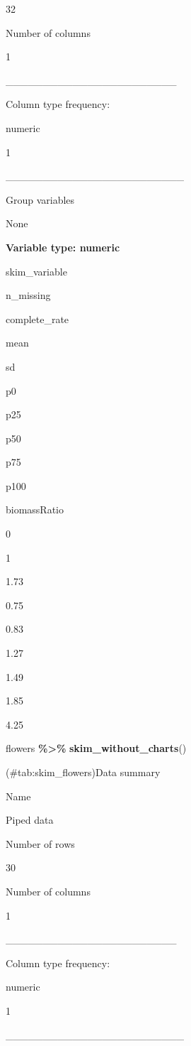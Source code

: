 \documentclass[
]{book}
\newenvironment{Shaded}{\begin{snugshade}}{\end{snugshade}}
\newcommand{\FunctionTok}[1]{\textcolor[rgb]{0.13,0.29,0.53}{\textbf{#1}}}
\newcommand{\NormalTok}[1]{#1}
\newcommand{\SpecialCharTok}[1]{\textcolor[rgb]{0.81,0.36,0.00}{\textbf{#1}}}
\begin{document}
32

Number of columns

1

\_\_\_\_\_\_\_\_\_\_\_\_\_\_\_\_\_\_\_\_\_\_\_

Column type frequency:

numeric

1

\_\_\_\_\_\_\_\_\_\_\_\_\_\_\_\_\_\_\_\_\_\_\_\_

Group variables

None

\textbf{Variable type: numeric}

skim\_variable

n\_missing

complete\_rate

mean

sd

p0

p25

p50

p75

p100

biomassRatio

0

1

1.73

0.75

0.83

1.27

1.49

1.85

4.25

\begin{Shaded}
\begin{Highlighting}[]
\NormalTok{flowers }\SpecialCharTok{\%\textgreater{}\%}
  \FunctionTok{skim\_without\_charts}\NormalTok{()}
\end{Highlighting}
\end{Shaded}

(\#tab:skim\_flowers)Data summary

Name

Piped data

Number of rows

30

Number of columns

1

\_\_\_\_\_\_\_\_\_\_\_\_\_\_\_\_\_\_\_\_\_\_\_

Column type frequency:

numeric

1

\_\_\_\_\_\_\_\_\_\_\_\_\_\_\_\_\_\_\_\_\_\_\_\_
\end{document}
